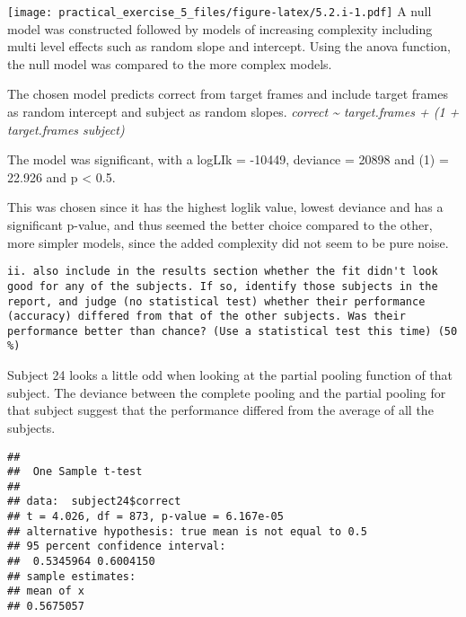 \documentclass[
]{article}
\newenvironment{Shaded}{\begin{snugshade}}{\end{snugshade}}
\newcommand{\AttributeTok}[1]{\textcolor[rgb]{0.77,0.63,0.00}{#1}}
\newcommand{\CommentTok}[1]{\textcolor[rgb]{0.56,0.35,0.01}{\textit{#1}}}
\newcommand{\FloatTok}[1]{\textcolor[rgb]{0.00,0.00,0.81}{#1}}
\newcommand{\FunctionTok}[1]{\textcolor[rgb]{0.00,0.00,0.00}{#1}}
\newcommand{\NormalTok}[1]{#1}
\newcommand{\OtherTok}[1]{\textcolor[rgb]{0.56,0.35,0.01}{#1}}
\newcommand{\SpecialCharTok}[1]{\textcolor[rgb]{0.00,0.00,0.00}{#1}}
\newcommand{\StringTok}[1]{\textcolor[rgb]{0.31,0.60,0.02}{#1}}
\begin{document}
\texttt{[image: practical\_exercise\_5\_files/figure-latex/5.2.i-1.pdf]} A
null model was constructed followed by models of increasing complexity
including multi level effects such as random slope and intercept. Using
the anova function, the null model was compared to the more complex
models.

The chosen model predicts correct from target frames and include target
frames as random intercept and subject as random slopes. \emph{correct
\textasciitilde{} target.frames + (1 + target.frames \textbar{}
subject)}

The model was significant, with a logLIk = -10449, deviance = 20898 and
\chi(1) = 22.926 and p \textless{} 0.5.

This was chosen since it has the highest loglik value, lowest deviance
and has a significant p-value, and thus seemed the better choice
compared to the other, more simpler models, since the added complexity
did not seem to be pure noise.

\begin{verbatim}
ii. also include in the results section whether the fit didn't look good for any of the subjects. If so, identify those subjects in the report, and judge (no statistical test) whether their performance (accuracy) differed from that of the other subjects. Was their performance better than chance? (Use a statistical test this time) (50 %)  
\end{verbatim}

Subject 24 looks a little odd when looking at the partial pooling
function of that subject. The deviance between the complete pooling and
the partial pooling for that subject suggest that the performance
differed from the average of all the subjects.

\begin{Shaded}
\end{Shaded}

\begin{verbatim}
## 
##  One Sample t-test
## 
## data:  subject24$correct
## t = 4.026, df = 873, p-value = 6.167e-05
## alternative hypothesis: true mean is not equal to 0.5
## 95 percent confidence interval:
##  0.5345964 0.6004150
## sample estimates:
## mean of x 
## 0.5675057
\end{verbatim}
\end{document}
